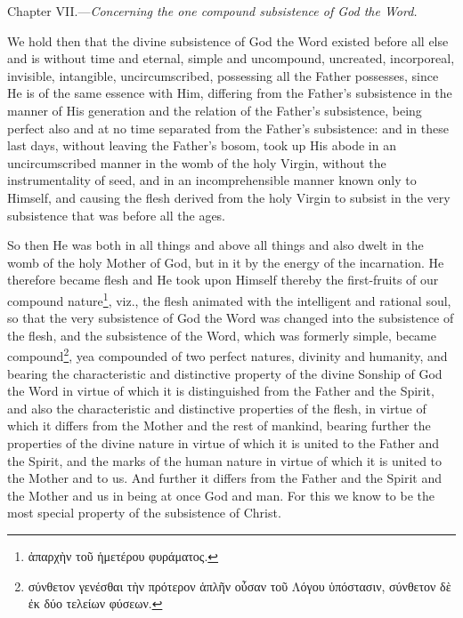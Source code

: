 Chapter VII.—\emph{Concerning the one compound subsistence of God the Word.}

We hold then that the divine subsistence of God the Word existed before all else and is without time and eternal, simple and uncompound, uncreated, incorporeal, invisible, intangible, uncircumscribed, possessing all the Father possesses, since He is of the same essence with Him, differing from the Father’s subsistence in the manner of His generation and the relation of the Father’s subsistence, being perfect also and at no time separated from the Father’s subsistence: and in these last days, without leaving the Father’s bosom, took up His abode in an uncircumscribed manner in the womb of the holy Virgin, without the instrumentality of seed, and in an incomprehensible manner known only to Himself, and causing the flesh derived from the holy Virgin to subsist in the very subsistence that was before all the ages.

So then He was both in all things and above all things and also dwelt in the womb of the holy Mother of God, but in it by the energy of the incarnation. He therefore became flesh and He took upon Himself thereby the first-fruits of our compound nature\footnote{\textgreek{ἀπαρχὴν τοῦ ἡμετέρου φυράματος}.}, viz., the flesh animated with the intelligent and rational soul, so that the very subsistence of God the Word was changed into the subsistence of the flesh, and the subsistence of the Word, which was formerly simple, became compound\footnote{\textgreek{σύνθετον γενέσθαι τὴν πρότερον ἁπλῆν οὖσαν τοῦ Λόγου ὑπόστασιν, σύνθετον δὲ ἐκ δύο τελείων φύσεων}.}, yea compounded of two perfect natures, divinity and humanity, and bearing the characteristic and distinctive property of the divine Sonship of God the Word in virtue of which it is distinguished from the Father and the Spirit, and also the characteristic and distinctive properties of the flesh, in virtue of which it differs from the Mother and the rest of mankind, bearing further the properties of the divine nature in virtue of which it is united to the Father and the Spirit, and the marks of the human nature in virtue of which it is united to the Mother and to us. And further it differs from the Father and the Spirit and the Mother and us in being at once God and man. For this we know to be the most special property of the subsistence of Christ.

